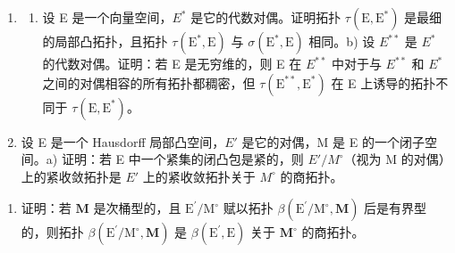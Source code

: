 \begin{enumerate}
\def\labelenumi{\arabic{enumi})}
\setcounter{enumi}{20}
\tightlist
\item
  \begin{enumerate}
  \def\labelenumii{\alph{enumii})}
  \tightlist
  \item
    设 E 是一个向量空间，\(E^{*}\) 是它的代数对偶。证明拓扑 \(\tau(\mathrm{E},\mathrm{E}^{*})\) 是最细的局部凸拓扑，且拓扑 \(\tau(\mathrm{E}^{*},\mathrm{E})\) 与 \(\sigma(\mathrm{E}^{*},\mathrm{E})\) 相同。b) 设 \(E^{**}\) 是 \(E^{*}\) 的代数对偶。证明：若 E 是无穷维的，则 E 在 \(E^{**}\) 中对于与 \(E^{**}\) 和 \(E^{*}\) 之间的对偶相容的所有拓扑都稠密，但 \(\tau(\mathrm{E}^{**},\mathrm{E}^{*})\) 在 E 上诱导的拓扑不同于 \(\tau(\mathrm{E},\mathrm{E}^{*})\)。
  \end{enumerate}
\item
  设 E 是一个 Hausdorff 局部凸空间，\(E'\) 是它的对偶，M 是 E 的一个闭子空间。a) 证明：若 E 中一个紧集的闭凸包是紧的，则 \(E'/M^{\circ}\)（视为 M 的对偶）上的紧收敛拓扑是 \(E'\) 上的紧收敛拓扑关于 \(M^{\circ}\) 的商拓扑。
\end{enumerate}

\begin{enumerate}
\def\labelenumi{\alph{enumi})}
\setcounter{enumi}{1}
\tightlist
\item
  证明：若 \(\mathbf{M}\) 是次桶型的，且 \(\mathrm{E}^{\prime} / \mathrm{M}^{\circ}\) 赋以拓扑 \(\beta (\mathrm{E}^{\prime} / \mathrm{M}^{\circ},\mathbf{M})\) 后是有界型的，则拓扑 \(\beta (\mathrm{E}^{\prime} / \mathrm{M}^{\circ},\mathbf{M})\) 是 \(\beta (\mathrm{E}^{\prime},\mathrm{E})\) 关于 \(\mathbf{M}^{\circ}\) 的商拓扑。
\end{enumerate}

